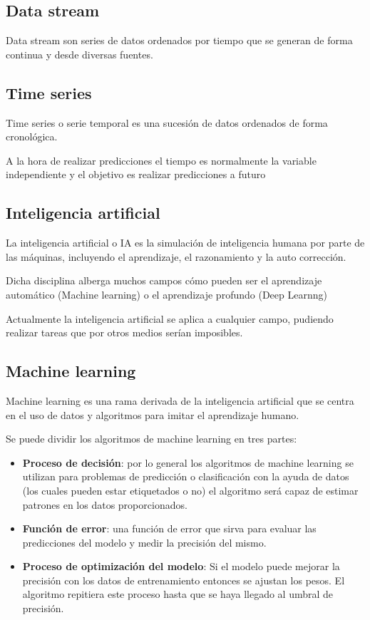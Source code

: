 \subsection{Data stream}

Data stream son series de datos ordenados por tiempo que se generan de forma continua y desde diversas fuentes.


\subsection{Time series}
Time series o serie temporal es una sucesión de datos ordenados de forma cronológica.

A la hora de realizar predicciones el tiempo es normalmente la variable independiente y el objetivo es realizar predicciones a futuro \cite{pagina:toward_data_scince}


\subsection{Inteligencia artificial}

La inteligencia artificial o IA es la simulación de inteligencia humana por parte de las máquinas, incluyendo el aprendizaje, el razonamiento y la auto corrección.

Dicha disciplina alberga muchos campos cómo pueden ser el aprendizaje automático (Machine learning) o el aprendizaje profundo (Deep Learnng)

Actualmente la inteligencia artificial se aplica a cualquier campo, pudiendo realizar tareas que por otros medios serían imposibles.\cite{pagina:techtarget}  

\subsection{Machine learning}

Machine learning es una rama derivada de la inteligencia artificial que se centra en el uso de datos y algoritmos para imitar el aprendizaje humano. \cite{pagina:IBM_Machine_learning}

Se puede dividir los algoritmos de machine learning en tres partes:

\begin{itemize}
    \item \textbf{Proceso de decisión}: por lo general los algoritmos de machine learning se utilizan para problemas de predicción o clasificación con la ayuda de datos (los cuales pueden estar etiquetados o no) el algoritmo será capaz de estimar patrones en los datos proporcionados.
    \item \textbf{Función de error}: una función de error que sirva para evaluar las predicciones del modelo y medir la precisión del mismo.
    
    \item \textbf{Proceso de optimización del modelo}: Si el modelo puede mejorar la precisión con los datos de entrenamiento entonces se ajustan los pesos. El algoritmo repitiera este proceso hasta que se haya llegado al umbral de precisión.

\end{itemize}




